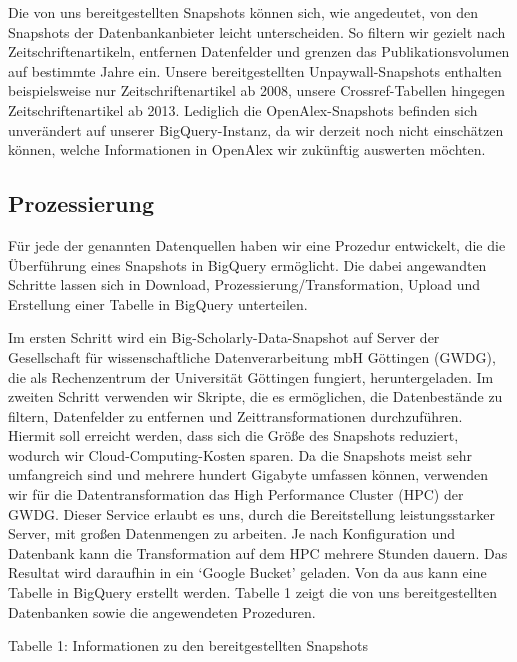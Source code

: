 \documentclass[a4paper,
fontsize=11pt,
oneside,
numbers=noperiodatend,
parskip=half-,
bibliography=totoc,
final
]{scrartcl}
\begin{document}
Die von uns bereitgestellten Snapshots können sich, wie angedeutet, von
den Snapshots der Datenbankanbieter leicht unterscheiden. So filtern wir
gezielt nach Zeitschriftenartikeln, entfernen Datenfelder und grenzen
das Publikationsvolumen auf bestimmte Jahre ein. Unsere bereitgestellten
Unpaywall-Snapshots enthalten beispielsweise nur Zeitschriftenartikel ab
2008, unsere Crossref-Tabellen hingegen Zeitschriftenartikel ab 2013.
Lediglich die OpenAlex-Snapshots befinden sich unverändert auf unserer
BigQuery-Instanz, da wir derzeit noch nicht einschätzen können, welche
Informationen in OpenAlex wir zukünftig auswerten möchten.

\hypertarget{prozessierung}{%
\subsection{Prozessierung}\label{prozessierung}}

Für jede der genannten Datenquellen haben wir eine Prozedur entwickelt,
die die Überführung eines Snapshots in BigQuery ermöglicht. Die dabei
angewandten Schritte lassen sich in Download,
Prozessierung/Transformation, Upload und Erstellung einer Tabelle in
BigQuery unterteilen.

Im ersten Schritt wird ein Big-Scholarly-Data-Snapshot auf Server der
Gesellschaft für wissenschaftliche Datenverarbeitung mbH Göttingen
(GWDG), die als Rechenzentrum der Universität Göttingen fungiert,
heruntergeladen. Im zweiten Schritt verwenden wir Skripte, die es
ermöglichen, die Datenbestände zu filtern, Datenfelder zu entfernen und
Zeittransformationen durchzuführen. Hiermit soll erreicht werden, dass
sich die Größe des Snapshots reduziert, wodurch wir
Cloud-Computing-Kosten sparen. Da die Snapshots meist sehr umfangreich
sind und mehrere hundert Gigabyte umfassen können, verwenden wir für die
Datentransformation das High Performance Cluster (HPC) der GWDG. Dieser
Service erlaubt es uns, durch die Bereitstellung leistungsstarker
Server, mit großen Datenmengen zu arbeiten. Je nach Konfiguration und
Datenbank kann die Transformation auf dem HPC mehrere Stunden dauern.
Das Resultat wird daraufhin in ein \enquote*{Google Bucket} geladen. Von
da aus kann eine Tabelle in BigQuery erstellt werden. Tabelle 1 zeigt
die von uns bereitgestellten Datenbanken sowie die angewendeten
Prozeduren.

Tabelle 1: Informationen zu den bereitgestellten Snapshots
\end{document}
